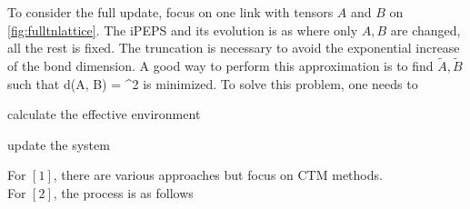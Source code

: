         To consider the full update, focus on one link with tensors $A$ and $B$ on \autoref{fig:fulltnlattice}. The iPEPS and its evolution is as
        \be {}     \ee
        where only $A,B$ are changed, all the rest is fixed. The truncation is necessary to avoid the exponential increase of the bond dimension. A good way to perform this approximation is to find $\tilde A, \tilde B$ such that
        \be d(\tilde A, \tilde B) = ^2 \ee
        is minimized. To solve this problem, one needs to
        \begin{enumerate}[label=${[\arabic*]}$]
            \item calculate the effective environment
            \item update the system
        \end{enumerate}
        For $[1]$, there are various approaches but focus on CTM methods.\\
        For $[2]$, the process is as follows
